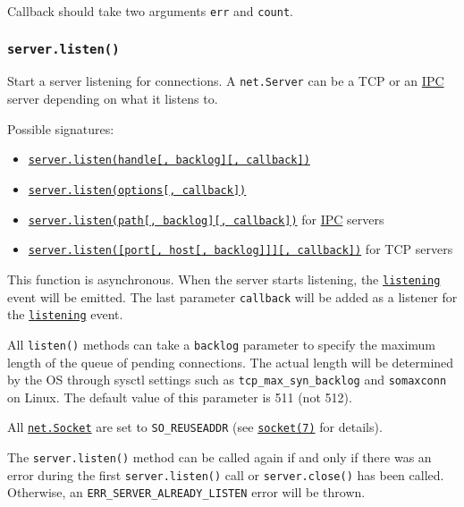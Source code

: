 Callback should take two arguments \texttt{err} and \texttt{count}.

\subsubsection{\texorpdfstring{\texttt{server.listen()}}{server.listen()}}\label{server.listen}

Start a server listening for connections. A \texttt{net.Server} can be a
TCP or an \hyperref[ipc-support]{IPC} server depending on what it
listens to.

Possible signatures:

\begin{itemize}
\tightlist
\item
  \hyperref[serverlistenhandle-backlog-callback]{\texttt{server.listen(handle{[},\ backlog{]}{[},\ callback{]})}}
\item
  \hyperref[serverlistenoptions-callback]{\texttt{server.listen(options{[},\ callback{]})}}
\item
  \hyperref[serverlistenpath-backlog-callback]{\texttt{server.listen(path{[},\ backlog{]}{[},\ callback{]})}}
  for \hyperref[ipc-support]{IPC} servers
\item
  \hyperref[serverlistenport-host-backlog-callback]{\texttt{server.listen({[}port{[},\ host{[},\ backlog{]}{]}{]}{[},\ callback{]})}}
  for TCP servers
\end{itemize}

This function is asynchronous. When the server starts listening, the
\hyperref[event-listening]{\texttt{\textquotesingle{}listening\textquotesingle{}}}
event will be emitted. The last parameter \texttt{callback} will be
added as a listener for the
\hyperref[event-listening]{\texttt{\textquotesingle{}listening\textquotesingle{}}}
event.

All \texttt{listen()} methods can take a \texttt{backlog} parameter to
specify the maximum length of the queue of pending connections. The
actual length will be determined by the OS through sysctl settings such
as \texttt{tcp\_max\_syn\_backlog} and \texttt{somaxconn} on Linux. The
default value of this parameter is 511 (not 512).

All \hyperref[class-netsocket]{\texttt{net.Socket}} are set to
\texttt{SO\_REUSEADDR} (see
\href{https://man7.org/linux/man-pages/man7/socket.7.html}{\texttt{socket(7)}}
for details).

The \texttt{server.listen()} method can be called again if and only if
there was an error during the first \texttt{server.listen()} call or
\texttt{server.close()} has been called. Otherwise, an
\texttt{ERR\_SERVER\_ALREADY\_LISTEN} error will be thrown.

